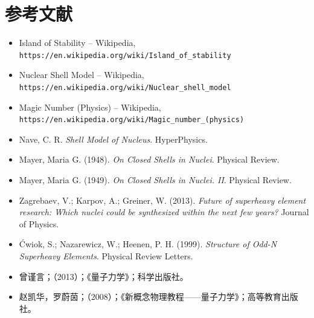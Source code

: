 \documentclass[a4paper,fontset=none]{ctexart}
\begin{document}
    \section*{参考文献}
    \begin{itemize}

        \item[1.] Island of Stability -- Wikipedia, \texttt{https://en.wikipedia.org/wiki/Island\_of\_stability}

        \item[2.] Nuclear Shell Model -- Wikipedia, \texttt{https://en.wikipedia.org/wiki/Nuclear\_shell\_model}

        \item[3.] Magic Number (Physics) -- Wikipedia, \texttt{https://en.wikipedia.org/wiki/Magic\_number\_(physics)}

        \item[4.] Nave, C. R. \textit{Shell Model of Nucleus}. HyperPhysics.

        \item[5.] Mayer, Maria G. (1948). \textit{On Closed Shells in Nuclei}. Physical Review.

        \item[6.] Mayer, Maria G. (1949). \textit{On Closed Shells in Nuclei. II}. Physical Review.

        \item[7.] Zagrebaev, V.; Karpov, A.; Greiner, W. (2013). \textit{Future of superheavy element research: Which nuclei could be synthesized within the next few years?} Journal of Physics.

        \item[8.] \'{C}wiok, S.; Nazarewicz, W.; Heenen, P. H. (1999). \textit{Structure of Odd-N Superheavy Elements}. Physical Review Letters.

        \item[9.] 曾谨言；（2013）；《量子力学》；科学出版社。

        \item[10.] 赵凯华，罗蔚茵；（2008）；《新概念物理教程——量子力学》；高等教育出版社。
    \end{itemize}
\end{document}
